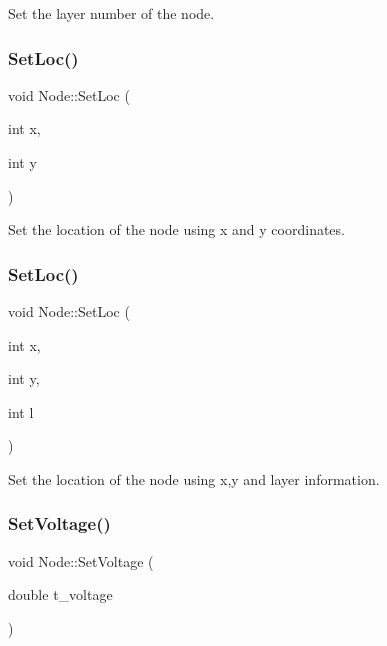 Set the layer number of the node. 

\mbox{\label{classNode_ab228394a1e206cf5d1bc995307f70f56}} 
\subsubsection{\texorpdfstring{Set\+Loc()}{SetLoc()}\hspace{0.1cm}{\footnotesize\ttfamily [1/2]}}
{\footnotesize\ttfamily void Node\+::\+Set\+Loc (\begin{DoxyParamCaption}\item[{int}]{x,  }\item[{int}]{y }\end{DoxyParamCaption})}



Set the location of the node using x and y coordinates. 

\mbox{\label{classNode_aeaa0eb1b9fed6f5c92594282de4d4d7d}} 
\subsubsection{\texorpdfstring{Set\+Loc()}{SetLoc()}\hspace{0.1cm}{\footnotesize\ttfamily [2/2]}}
{\footnotesize\ttfamily void Node\+::\+Set\+Loc (\begin{DoxyParamCaption}\item[{int}]{x,  }\item[{int}]{y,  }\item[{int}]{l }\end{DoxyParamCaption})}



Set the location of the node using x,y and layer information. 

\mbox{\label{classNode_af5846cceb0ea097fdfba48152402c152}} 
\subsubsection{\texorpdfstring{Set\+Voltage()}{SetVoltage()}}
{\footnotesize\ttfamily void Node\+::\+Set\+Voltage (\begin{DoxyParamCaption}\item[{double}]{t\+\_\+voltage }\end{DoxyParamCaption})}



